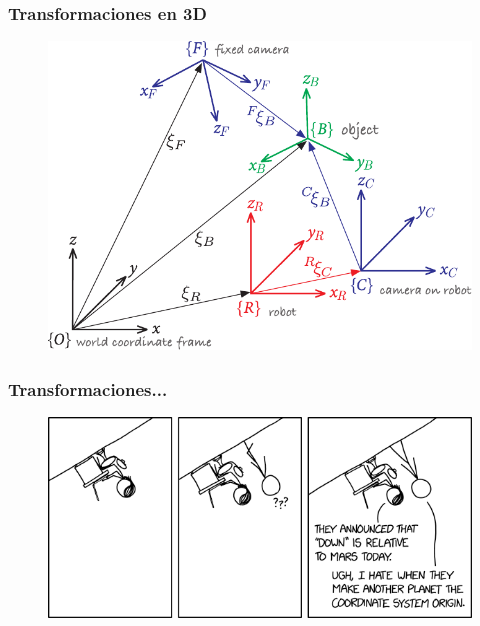 \begin{frame}
    \frametitle{Transformaciones en 3D}

    \begin{figure}[!h]
        \includegraphics[width=0.6\columnwidth]{./images/multiple_coordinate_frames_3d.pdf}
    \end{figure}

\end{frame}

\begin{frame}
    \frametitle{Transformaciones...}
    
    \begin{figure}[!h]
        \includegraphics[width=\columnwidth]{./images/joke_coordinate_systems.png}
    \end{figure}
    
\end{frame}


